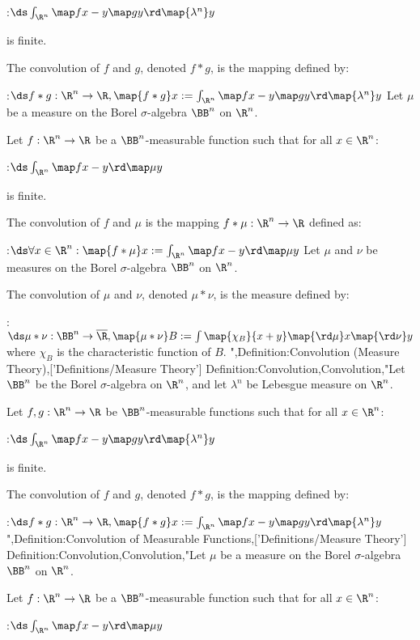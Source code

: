 :$\ds \int_{\R^n} \map f {x - y} \map g y \rd \map {\lambda^n} y$

is finite.


The convolution of $f$ and $g$, denoted $f * g$, is the mapping defined by:

:$\ds f * g: \R^n \to \R, \map {f * g} x := \int_{\R^n} \map f {x - y} \map g y \rd \map {\lambda^n} y$
Let $\mu$ be a measure on the Borel $\sigma$-algebra $\BB^n$ on $\R^n$.

Let $f: \R^n \to \R$ be a $\BB^n$-measurable function such that for all $x \in \R^n$:

:$\ds \int_{\R^n} \map f {x - y} \rd \map \mu y$

is finite.


The convolution of $f$ and $\mu$ is the mapping $f * \mu: \R^n \to \R$ defined as:

:$\ds \forall x \in \R^n: \map {f * \mu} x := \int_{\R^n} \map f {x - y} \rd \map \mu y$
Let $\mu$ and $\nu$ be measures on the Borel $\sigma$-algebra $\BB^n$ on $\R^n$.


The convolution of $\mu$ and $\nu$, denoted $\mu * \nu$, is the measure defined by:

:$\ds \mu * \nu: \BB^n \to \overline \R, \map {\mu * \nu} B := \int \map {\chi_B} {x + y} \map {\rd \mu} x \map {\rd \nu} y$
where $\chi_B$ is the characteristic function of $B$.
",Definition:Convolution (Measure Theory),['Definitions/Measure Theory']
Definition:Convolution,Convolution,"Let $\BB^n$ be the Borel $\sigma$-algebra on $\R^n$, and let $\lambda^n$ be Lebesgue measure on $\R^n$.

Let $f, g: \R^n \to \R$ be $\BB^n$-measurable functions such that for all $x \in \R^n$:

:$\ds \int_{\R^n} \map f {x - y} \map g y \rd \map {\lambda^n} y$

is finite.


The convolution of $f$ and $g$, denoted $f * g$, is the mapping defined by:

:$\ds f * g: \R^n \to \R, \map {f * g} x := \int_{\R^n} \map f {x - y} \map g y \rd \map {\lambda^n} y$",Definition:Convolution of Measurable Functions,['Definitions/Measure Theory']
Definition:Convolution,Convolution,"Let $\mu$ be a measure on the Borel $\sigma$-algebra $\BB^n$ on $\R^n$.

Let $f: \R^n \to \R$ be a $\BB^n$-measurable function such that for all $x \in \R^n$:

:$\ds \int_{\R^n} \map f {x - y} \rd \map \mu y$

